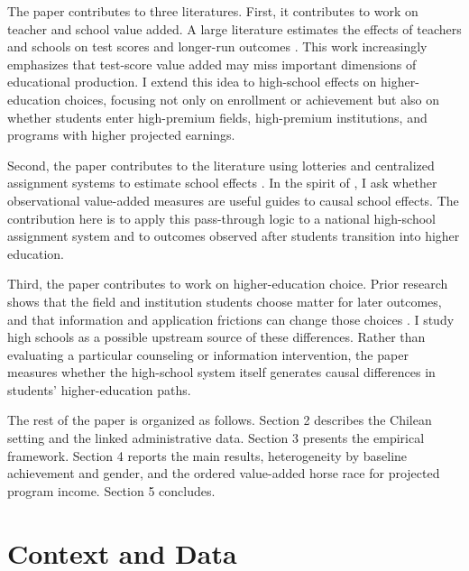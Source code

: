 \documentclass[a4paper, article, english, oneside, unknownkeysallowed, 12pt]{memoir}
\begin{document}
The paper contributes to three literatures.
First, it contributes to work on teacher and school value added.
A large literature estimates the effects of teachers and schools on test scores and longer-run outcomes \parencite{chetty_measuring_2014, dobbie_medium-term_2015, jackson_what_2018, beuermann_what_2023, rose_effects_2022}.
This work increasingly emphasizes that test-score value added may miss important dimensions of educational production.
I extend this idea to high-school effects on higher-education choices, focusing not only on enrollment or achievement but also on whether students enter high-premium fields, high-premium institutions, and programs with higher projected earnings.


Second, the paper contributes to the literature using lotteries and centralized assignment systems to estimate school effects \parencite{abdulkadiroglu_elite_2014, abdulkadiroglu_research_2017, angrist_credible_2024}.
In the spirit of \textcite{angrist_leveraging_2017}, I ask whether observational value-added measures are useful guides to causal school effects.
The contribution here is to apply this pass-through logic to a national high-school assignment system and to outcomes observed after students transition into higher education.

Third, the paper contributes to work on higher-education choice.
Prior research shows that the field and institution students choose matter for later outcomes, and that information and application frictions can change those choices \parencite{kirkeboen_field_2016, hoxby_what_2015, dynarski_closing_2021, hastings_informed_2016, chetty_diversifying_2025}.
I study high schools as a possible upstream source of these differences.
Rather than evaluating a particular counseling or information intervention, the paper measures whether the high-school system itself generates causal differences in students' higher-education paths.

The rest of the paper is organized as follows.
Section 2 describes the Chilean setting and the linked administrative data.
Section 3 presents the empirical framework.
Section 4 reports the main results, heterogeneity by baseline achievement and gender, and the ordered value-added horse race for projected program income.
Section 5 concludes.

\clearpage
\section{Context and Data}
\end{document}

